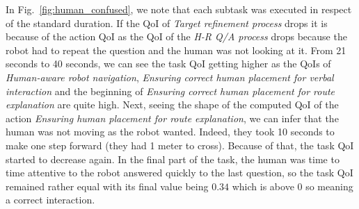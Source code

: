 \documentclass[a4paper,11pt,twoside]{StyleThese}
\begin{document}
In Fig.~\ref{fig:human_confused}, we note that each subtask was executed in respect of the standard duration. If the QoI of \emph{Target refinement process} drops it is because of the action QoI as the QoI of the \emph{H-R Q/A process} drops because the robot had to repeat the question and the human was not looking at it. From 21 seconds to 40 seconds, we can see the task QoI getting higher as the QoIs of \emph{Human-aware robot navigation}, \emph{Ensuring correct human placement for verbal interaction} and the beginning of \emph{Ensuring correct human placement for route explanation} are quite high. Next, seeing the shape of the computed QoI of the action \emph{Ensuring human placement for route explanation}, we can infer that the human was not moving as the robot wanted. Indeed, they took 10 seconds to make one step forward (they had 1 meter to cross). Because of that, the task QoI started to decrease again. In the final part of the task, the human was time to time attentive to the robot answered quickly to the last question, so the task QoI remained rather equal with its final value being $0.34$ which is above 0 so meaning a correct interaction.
\end{document}
